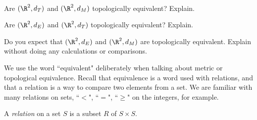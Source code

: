 \begin{activity} ~
\ba
\item Are $(\R^2,d_T)$ and $(\R^2, d_M)$ topologically equivalent? Explain.


\begin{comment}

Let $x = (x_1,x_2)$ and $y=(y_1,y_2)$ be in $\R^2$. Notice that 
\[d_M(x,y) = \max\{| x_1-y_1 |, | x_2-y_2 |\} \leq | x_1-y_1 | + | x_2-y_2 | = d_T(x,y).\]
Also,
\[d_T(x,y) = | x_1-y_1 | + | x_2-y_2 | \leq 2\max\{| x_1-y_1 |, | x_2-y_2 |\} = 2d_M(x,y).\]
So $(\R^2,d_T)$ and $(\R^2, d_M)$ are topologically equivalent. 

\end{comment}

\item Are $(\R^2,d_E)$ and $(\R^2, d_T)$ topologically equivalent? Explain.


\begin{comment}

Let $x = (x_1,x_2)$ and $y=(y_1,y_2)$ be in $\R^2$. Notice that 
\[d_E(x,y) = \sqrt{(x_1-y_1)^2 + (x_2-y_2)^2} \leq \sqrt{(x_1-y_1)^2} + \sqrt{(x_2-y_2)^2} =  | x_1-y_1 | + | x_2-y_2 | \leq d_T(x,y).\]
Also,
\[d_T(x,y) = | x_1-y_1 | + | x_2-y_2 | = \sqrt{(x_1-y_1)^2} + \sqrt{(x_2-y_2)^2} \leq \sqrt{(x_1-y_1)^2+(x_2-y_2)^2} + \sqrt{(x_1-y_1)^2+(x_2-y_2)^2} = 2d_E(x,y).\]
So $(\R^2,d_T)$ and $(\R^2, d_T)$ are topologically equivalent. 

\end{comment}

\item Do you expect that $(\R^2,d_E)$ and $(\R^2, d_M)$ are topologically equivalent. Explain without doing any calculations or comparisons.



 
\ea

\end{activity}



We use the word ``equivalent" deliberately when talking about metric or topological equivalence. Recall that equivalence is a word used with relations, and that a relation is a way to compare two elements from a set. We are familiar with many relations on sets, ``$<$", ``$=$", ``$\geq$" on the integers, for example.  



\begin{definition} A \emph{relation} on a set $S$ is a subset $R$ of $S \times S$.
\end{definition}



